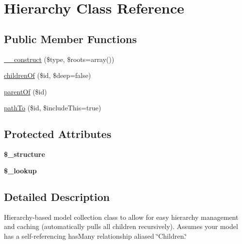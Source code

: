 \hypertarget{classHierarchy}{
\section{Hierarchy Class Reference}
\label{classHierarchy}
}
\subsection*{Public Member Functions}
\begin{DoxyCompactItemize}
\item 
\hyperlink{classHierarchy_a6bd1635911af5bd6472b060f177c841a}{\_\-\_\-construct} (\$type, \$roots=array())
\item 
\hyperlink{classHierarchy_a51c0b25ea641b1de5c72dca9a8a992c5}{childrenOf} (\$id, \$deep=false)
\item 
\hyperlink{classHierarchy_a7334e9be19629ef54f19e71ed3cf413b}{parentOf} (\$id)
\item 
\hyperlink{classHierarchy_ad54d88d65797331b1e6aebdd2a61c23b}{pathTo} (\$id, \$includeThis=true)
\end{DoxyCompactItemize}
\subsection*{Protected Attributes}
\begin{DoxyCompactItemize}
\item 
\hypertarget{classHierarchy_a8e4a8dea319d86aa81f82b0526be4bcc}{
{\bfseries \$\_\-structure}}
\label{classHierarchy_a8e4a8dea319d86aa81f82b0526be4bcc}

\item 
\hypertarget{classHierarchy_a92e8aa798f924f01a4cf4bd98dc56908}{
{\bfseries \$\_\-lookup}}
\label{classHierarchy_a92e8aa798f924f01a4cf4bd98dc56908}

\end{DoxyCompactItemize}


\subsection{Detailed Description}
Hierarchy-\/based model collection class to allow for easy hierarchy management and caching (automatically pulls all children recursively). Assumes your model has a self-\/referencing hasMany relationship aliased \char`\"{}Children.\char`\"{} 

